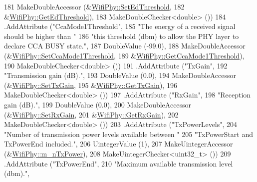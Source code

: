 \begin{DoxyCode}
181                    MakeDoubleAccessor (&\hyperlink{classns3_1_1WifiPhy_ada7b3c43a2a3456ada2b622a99002042}{WifiPhy::SetEdThreshold},
182                                        &\hyperlink{classns3_1_1WifiPhy_a7d758519cd4138e8f6adc4f0c3f2a2b6}{WifiPhy::GetEdThreshold}),
183                    MakeDoubleChecker<double> ())
184     .AddAttribute (\textcolor{stringliteral}{"CcaMode1Threshold"},
185                    \textcolor{stringliteral}{"The energy of a received signal should be higher than "}
186                    \textcolor{stringliteral}{"this threshold (dbm) to allow the PHY layer to declare CCA BUSY state."},
187                    DoubleValue (-99.0),
188                    MakeDoubleAccessor (&\hyperlink{classns3_1_1WifiPhy_a66c57f8c7bc8b995e98a25a3f9c82fd9}{WifiPhy::SetCcaMode1Threshold},
189                                        &\hyperlink{classns3_1_1WifiPhy_a811453df7799781833e091f1da58f5db}{WifiPhy::GetCcaMode1Threshold}),
190                    MakeDoubleChecker<double> ())
191     .AddAttribute (\textcolor{stringliteral}{"TxGain"},
192                    \textcolor{stringliteral}{"Transmission gain (dB)."},
193                    DoubleValue (0.0),
194                    MakeDoubleAccessor (&\hyperlink{classns3_1_1WifiPhy_ab99344dc30e405b377bb1c9ebeec13a9}{WifiPhy::SetTxGain},
195                                        &\hyperlink{classns3_1_1WifiPhy_a02ecf17945090f27057353bc5784f035}{WifiPhy::GetTxGain}),
196                    MakeDoubleChecker<double> ())
197     .AddAttribute (\textcolor{stringliteral}{"RxGain"},
198                    \textcolor{stringliteral}{"Reception gain (dB)."},
199                    DoubleValue (0.0),
200                    MakeDoubleAccessor (&\hyperlink{classns3_1_1WifiPhy_ab6761e5e5169447422aff503bab4ee28}{WifiPhy::SetRxGain},
201                                        &\hyperlink{classns3_1_1WifiPhy_ac794a3605ed0524f4182d0b72bee9049}{WifiPhy::GetRxGain}),
202                    MakeDoubleChecker<double> ())
203     .AddAttribute (\textcolor{stringliteral}{"TxPowerLevels"},
204                    \textcolor{stringliteral}{"Number of transmission power levels available between "}
205                    \textcolor{stringliteral}{"TxPowerStart and TxPowerEnd included."},
206                    UintegerValue (1),
207                    MakeUintegerAccessor (&\hyperlink{classns3_1_1WifiPhy_a8b60afe8722e7057024166152a813487}{WifiPhy::m\_nTxPower}),
208                    MakeUintegerChecker<uint32\_t> ())
209     .AddAttribute (\textcolor{stringliteral}{"TxPowerEnd"},
210                    \textcolor{stringliteral}{"Maximum available transmission level (dbm)."},

\end{DoxyCode}
